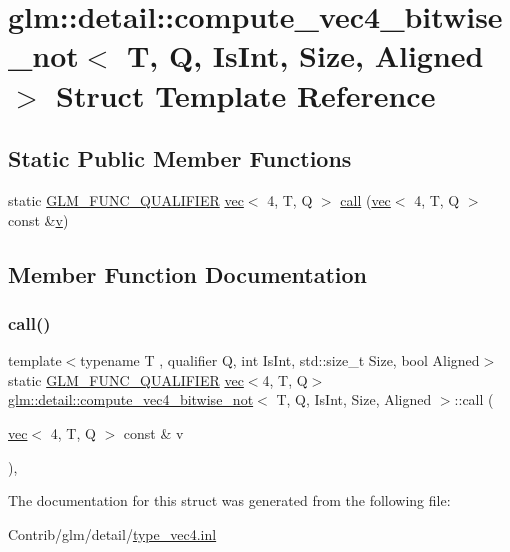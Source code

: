 \hypertarget{structglm_1_1detail_1_1compute__vec4__bitwise__not}{}\section{glm\+:\+:detail\+:\+:compute\+\_\+vec4\+\_\+bitwise\+\_\+not$<$ T, Q, Is\+Int, Size, Aligned $>$ Struct Template Reference}
\label{structglm_1_1detail_1_1compute__vec4__bitwise__not}
\subsection*{Static Public Member Functions}
\begin{DoxyCompactItemize}
\item 
static \mbox{\hyperlink{setup_8hpp_a33fdea6f91c5f834105f7415e2a64407}{G\+L\+M\+\_\+\+F\+U\+N\+C\+\_\+\+Q\+U\+A\+L\+I\+F\+I\+ER}} \mbox{\hyperlink{structglm_1_1vec}{vec}}$<$ 4, T, Q $>$ \mbox{\hyperlink{structglm_1_1detail_1_1compute__vec4__bitwise__not_acbbd35ec67e0955a02cee35d6cfbb381}{call}} (\mbox{\hyperlink{structglm_1_1vec}{vec}}$<$ 4, T, Q $>$ const \&\mbox{\hyperlink{_s_d_l__opengl_8h_a10a82eabcb59d2fcd74acee063775f90}{v}})
\end{DoxyCompactItemize}


\subsection{Member Function Documentation}
\mbox{\label{structglm_1_1detail_1_1compute__vec4__bitwise__not_acbbd35ec67e0955a02cee35d6cfbb381}} 
\subsubsection{\texorpdfstring{call()}{call()}}
{\footnotesize\ttfamily template$<$typename T , qualifier Q, int Is\+Int, std\+::size\+\_\+t Size, bool Aligned$>$ \\
static \mbox{\hyperlink{setup_8hpp_a33fdea6f91c5f834105f7415e2a64407}{G\+L\+M\+\_\+\+F\+U\+N\+C\+\_\+\+Q\+U\+A\+L\+I\+F\+I\+ER}} \mbox{\hyperlink{structglm_1_1vec}{vec}}$<$4, T, Q$>$ \mbox{\hyperlink{structglm_1_1detail_1_1compute__vec4__bitwise__not}{glm\+::detail\+::compute\+\_\+vec4\+\_\+bitwise\+\_\+not}}$<$ T, Q, Is\+Int, Size, Aligned $>$\+::call (\begin{DoxyParamCaption}\item[{\mbox{\hyperlink{structglm_1_1vec}{vec}}$<$ 4, T, Q $>$ const \&}]{v }\end{DoxyParamCaption})\hspace{0.3cm}{\ttfamily [inline]}, {\ttfamily [static]}}



The documentation for this struct was generated from the following file\+:\begin{DoxyCompactItemize}
\item 
Contrib/glm/detail/\mbox{\hyperlink{type__vec4_8inl}{type\+\_\+vec4.\+inl}}\end{DoxyCompactItemize}
